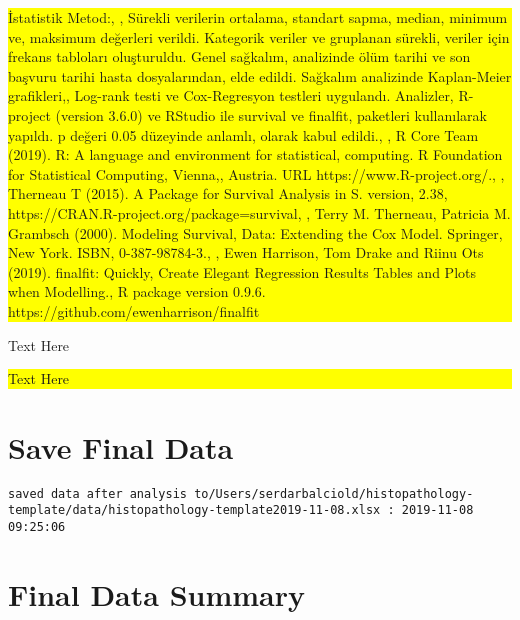 \documentclass[]{article}
\begin{document}
\noindent

\colorbox{yellow}{
\parbox{\dimexpr\linewidth-2\fboxsep}{

İstatistik Metod:, , Sürekli verilerin ortalama, standart sapma, median, minimum ve, maksimum değerleri verildi. Kategorik veriler ve gruplanan sürekli, veriler için frekans tabloları oluşturuldu. Genel sağkalım, analizinde ölüm tarihi ve son başvuru tarihi hasta dosyalarından, elde edildi.  Sağkalım analizinde Kaplan-Meier grafikleri,, Log-rank testi ve Cox-Regresyon testleri uygulandı. Analizler, R-project (version 3.6.0) ve RStudio ile survival ve finalfit, paketleri kullanılarak yapıldı. p değeri 0.05 düzeyinde anlamlı, olarak kabul edildi., , R Core Team (2019). R: A language and environment for statistical, computing. R Foundation for Statistical Computing, Vienna,, Austria. URL https://www.R-project.org/., , Therneau T (2015). A Package for Survival Analysis in S. version, 2.38, https://CRAN.R-project.org/package=survival, , Terry M. Therneau, Patricia M. Grambsch (2000). Modeling Survival, Data: Extending the Cox Model. Springer, New York. ISBN, 0-387-98784-3., , Ewen Harrison, Tom Drake and Riinu Ots (2019). finalfit: Quickly, Create Elegant Regression Results Tables and Plots when Modelling., R package version 0.9.6. https://github.com/ewenharrison/finalfit

}
}

\pagebreak

Text Here

\noindent

\colorbox{yellow}{
\parbox{\dimexpr\linewidth-2\fboxsep}{

Text Here

}
}

\pagebreak

\hypertarget{save-final-data}{%
\section{Save Final Data}\label{save-final-data}}

\begin{verbatim}
saved data after analysis to/Users/serdarbalciold/histopathology-template/data/histopathology-template2019-11-08.xlsx : 2019-11-08 09:25:06
\end{verbatim}

\pagebreak

\hypertarget{final-data-summary}{%
\section{Final Data Summary}\label{final-data-summary}}
\end{document}
